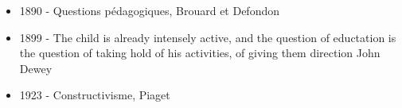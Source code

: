 \begin{frame}
  \begin{itemize}
  \item 1890 - Questions pédagogiques, Brouard et Defondon
  \item 1899 - \og{}The child is already intensely active, and the question 
  of eductation is the question of taking hold of his activities, of 
  giving them direction\fg{} John Dewey
  \item 1923 - Constructivisme, Piaget
  \end{itemize}
  
\end{frame}


